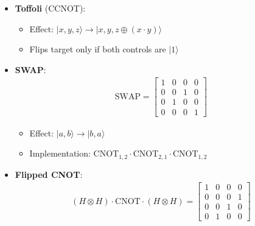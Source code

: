 \begin{multicols}{3}
\begin{itemize}[leftmargin=*,nosep,topsep=0pt]
                    \item \textbf{Toffoli} (CCNOT):
                      \begin{itemize}[nosep]
                        \item Effect: $|x,y,z\rangle \to |x,y,z \oplus (x \cdot y)\rangle$
                        \item Flips target only if both controls are $|1\rangle$
                      \end{itemize}

                    \item \textbf{SWAP}:
                      \begin{align*}
                        \text{SWAP} = \begin{bmatrix}
                          1 & 0 & 0 & 0 \\
                          0 & 0 & 1 & 0 \\
                          0 & 1 & 0 & 0 \\
                          0 & 0 & 0 & 1
                        \end{bmatrix}
                      \end{align*}
                      \begin{itemize}[nosep]
                        \item Effect: $|a,b\rangle \to |b,a\rangle$

                        \item Implementation: $\text{CNOT}_{1,2} \cdot \text{CNOT}_{2,1}
                          \cdot \text{CNOT}_{1,2}$
                      \end{itemize}

                    \item \textbf{Flipped CNOT}:
                      \begin{align*}
                        (H \otimes H) \cdot \text{CNOT} \cdot (H \otimes H) = \begin{bmatrix}
                          1 & 0 & 0 & 0 \\
                          0 & 0 & 0 & 1 \\
                          0 & 0 & 1 & 0 \\
                          0 & 1 & 0 & 0
                        \end{bmatrix}
                      \end{align*}
                  \end{itemize}


\end{multicols}
